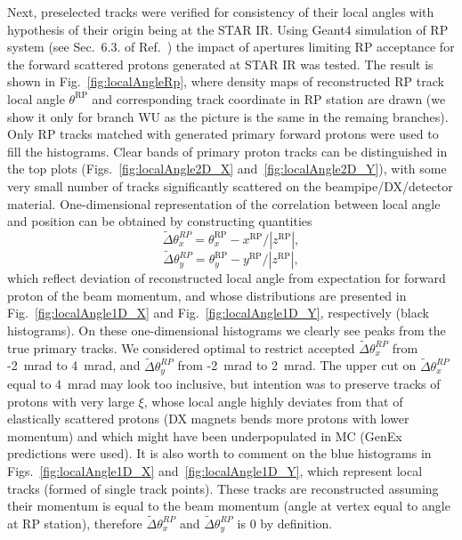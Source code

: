 
Next, preselected tracks were verified for consistency of their local angles with hypothesis of their origin being at the STAR IR. Using Geant4 simulation of RP system (see Sec.~6.3. of Ref.~\cite{supplementaryNote}) the impact of apertures limiting RP acceptance for the forward scattered protons generated at STAR IR was tested. The result is shown in Fig.~\ref{fig:localAngleRp}, where density maps of reconstructed RP track local angle $\theta^{\text{RP}}$ and corresponding track coordinate in RP station are drawn (we show it only for branch WU as the picture is the same in the remaing branches). Only RP tracks matched with generated primary forward protons were used to fill the histograms. Clear bands of primary proton tracks can be distinguished in the top plots (Figs.~\ref{fig:localAngle2D_X} and~\ref{fig:localAngle2D_Y}), with some very small number of tracks significantly scattered on the beampipe/DX/detector material. One-dimensional representation of the correlation between local angle and position can be obtained by constructing quantities
\begin{equation}
 \widetilde{\Delta}\theta_{x}^{RP} = \theta_{x}^{\text{RP}}-x^{\text{RP}}/|z^{\text{RP}}|,
\end{equation}
\begin{equation}
 \widetilde{\Delta}\theta_{y}^{RP} = \theta_{y}^{\text{RP}}-y^{\text{RP}}/|z^{\text{RP}}|,
\end{equation}%
which reflect deviation of reconstructed local angle from expectation for forward proton of the beam momentum, and whose distributions are presented in Fig.~\ref{fig:localAngle1D_X} and Fig.~\ref{fig:localAngle1D_Y}, respectively (black histograms). On these one-dimensional histograms we clearly see peaks from the true primary tracks. We considered optimal to restrict accepted $\widetilde{\Delta}\theta_{x}^{RP}$ from -2~mrad to 4~mrad, and $\widetilde{\Delta}\theta_{y}^{RP}$ from -2~mrad to 2~mrad. The upper cut on $\widetilde{\Delta}\theta_{x}^{RP}$ equal to  4~mrad may look too inclusive, but intention was to preserve tracks of protons with very large $\xi$, whose local angle highly deviates from that of elastically scattered protons (DX magnets bends more protons with lower momentum) and which might have been underpopulated in MC (GenEx predictions were used). It is also worth to comment on the blue histograms in Figs.~\ref{fig:localAngle1D_X} and~\ref{fig:localAngle1D_Y}, which represent local tracks (formed of single track points). These tracks are reconstructed assuming their momentum is equal to the beam momentum (angle at vertex equal to angle at RP station), therefore $\widetilde{\Delta}\theta_{x}^{RP}$ and $\widetilde{\Delta}\theta_{y}^{RP}$ is 0 by definition.


